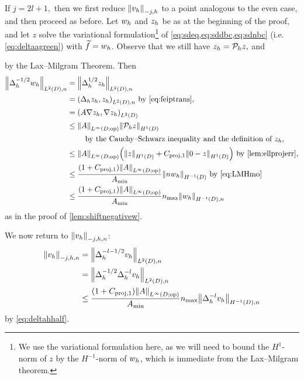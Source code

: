 If $j=2l+1,$ then we first reduce $\Nfn{-j,h}{\vh}$ to a point analogous to the even case, and then proceed as before. Let $w_{h}$ and $z_{h}$ be as at the beginning of the proof, and let $z$ solve the variational formulation\footnote{We use the variational formulation here, as we will need to bound the $H^1$-norm of $z$ by the $H^{-1}$-norm of $w_{h}$, which is immediate from the Lax--Milgram theorem.}  of \cref{eq:sdeq,eq:sddbc,eq:sdnbc} (i.e. \cref{eq:deltaagreen}) with $\widetilde{f} = w_{h}$. Observe that we still have $z_{h} = \mathcal P_{h} z,$ and

\beq\label{eq:LMHmo}
 \leq {} 
\eeq
by the Lax--Milgram Theorem. Then
\begin{align}
\NLtDn{\Deltah^{-1/2}\wh} &= \NLtDn{\Deltah^{1/2} \zh}\nonumber\\
&= \IPLtDn{\Deltah \zh}{\zh} \text{ by \cref{eq:feiptrans},}\\
&= \IPLtD{A \grad \zh}{\grad \zh}\nonumber\\
&\leq \NLiDop{A} \NHoD{\Ph z}\nonumber\\
&\quad\quad\text{ by the Cauchy--Schwarz inequality and the definition of } \zh,\nonumber\\
&\leq \NLiDop{A}\mleft(\NHoD{z} + \Cprojfn{1}\NHoD{0 - z}\mright) \text{ by \cref{lem:ellprojerr},}\nonumber\\
&\leq \frac{\mleft(1+\Cprojfn{1}\mright)\NLiDop{A}}{\Amin}  \NHmoD{n\wh}\text{ by \cref{eq:LMHmo}}\label{eq:deltahhalf}\\
&\leq \frac{\mleft(1+\Cprojfn{1}\mright)\NLiDop{A}}{\Amin}\nmax  \NHnfn{-1}{D}{\wh}\nonumber
\end{align}
as in the proof of \cref{lem:shiftnegativew}.

We now return to $\Nfn{-j,h,n}{\vh}$:
\begin{align*}
  \Nfn{-j,h,n}{\vh} &= \NLtDn{\Deltah^{-l-1/2} \vh}\\
  &= \NLtDn{\Deltah^{-1/2} \Deltah^{-l} \vh}\\
&\leq \frac{\mleft(1+\Cprojfn{1}\mright)\NLiDop{A}}{\Amin}\nmax\NHnfn{-1}{D}{\Deltah^{-l}\vh}
\end{align*}
by \cref{eq:deltahhalf}.

